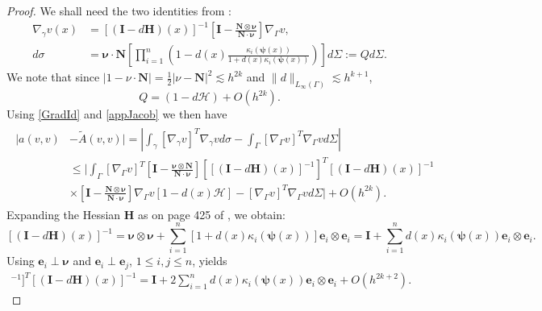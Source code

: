 \documentclass{siamart0516}
\numberwithin{equation}{section}
\numberwithin{theorem}{section}
\numberwithin{figure}{section}
\begin{document}
\begin{proof}
	We shall need the two identities from \cite{DD07}:
	\begin{align}
		\nabla_{\gamma}v(x) &= [(\mathbf{I} - d\mathbf{H})(x)]^{-1}\left[ \mathbf{I} - \frac{\mathbf{N}\otimes\mathbf{\nu}}{\mathbf{N}\cdot\mathbf{\nu}} \right]\nabla_{\Gamma}v,
		\label{GradId}
\\
		d\sigma &= \mathbf{\nu}\cdot\mathbf{N}\left[\prod_{i=1}^n\left(1-d(x)\frac{\kappa_i(\mathbf{\psi}(x))}{1 + d(x)\kappa_i(\mathbf{\psi}(x))}\right)\right]d\Sigma := Qd\Sigma.
		\label{Jacob}
	\end{align}
	We note that since $|1-\nu\cdot \mathbf{N}| = \frac{1}{2}|\nu-\mathbf{N}|^2\lesssim h^{2k}$ and $\|d\|_{L_\infty(\Gamma)}\lesssim h^{k+1}$,
	\begin{equation}
	Q = (1-d\mathcal{H}) + O(h^{2k}).
	\label{appJacob}
	\end{equation}
Using \eqref{GradId} and \eqref{appJacob} we then have
\begin{align}
\begin{aligned}
	|a(v,v)& -\widetilde{A}(v,v)| = \left|\int_{\gamma}[\nabla_\gamma v]^T\nabla_\gamma v d\sigma - \int_{\Gamma} [\nabla_\Gamma v]^T\nabla_\Gamma v d\Sigma\right|\\
	&\leq \bigg|\int_{\Gamma}\left[\nabla_{\Gamma}v\right]^T\left[ \mathbf{I} - \frac{\mathbf{\nu}\otimes\mathbf{N}}{\mathbf{N}\cdot\mathbf{\nu}}\right][[(\mathbf{I} - d\mathbf{H})(x)]^{-1}]^T[(\mathbf{I} - d\mathbf{H})(x)]^{-1}\\
	&\times\left[ \mathbf{I} - \frac{\mathbf{N}\otimes\mathbf{\nu}}{\mathbf{N}\cdot\mathbf{\nu}} \right]
	\nabla_{\Gamma}v \left[1-d(x)\mathcal{H}\right] 
	- [\nabla_\Gamma v]^T \nabla_\Gamma vd\Sigma\bigg|
	+O(h^{2k}).
\end{aligned}
\label{One}	
\end{align}
	Expanding the Hessian $\mathbf{H}$ as on page 425 of \cite{DD07}, we obtain:
	$$
	[(\mathbf{I} - d\mathbf{H})(x)]^{-1} = \mathbf{\nu}\otimes\mathbf{\nu} + \sum_{i=1}^n[1 + d(x)\kappa_i(\mathbf{\psi}(x))]\mathbf{e}_i\otimes\mathbf{e}_i
	= \mathbf{I} + \sum_{i=1}^nd(x)\kappa_i(\mathbf{\psi}(x))\mathbf{e}_i\otimes\mathbf{e}_i.
	$$
Using $\mathbf{e}_i\perp\mathbf{\nu}$ and $\mathbf{e}_i\perp\mathbf{e}_j$, $1\leq i,j\leq n$, yields
\begin{align*}
	[[(\mathbf{I} - d\mathbf{H})(x)]^{-1}]^T[(\mathbf{I} - d\mathbf{H})(x)]^{-1} =\mathbf{I} + 2\sum_{i=1}^nd(x)\kappa_i(\mathbf{\psi}(x))\mathbf{e}_i\otimes\mathbf{e}_i + O(h^{2k+2}).
\end{align*}

\end{proof}
\end{document}
